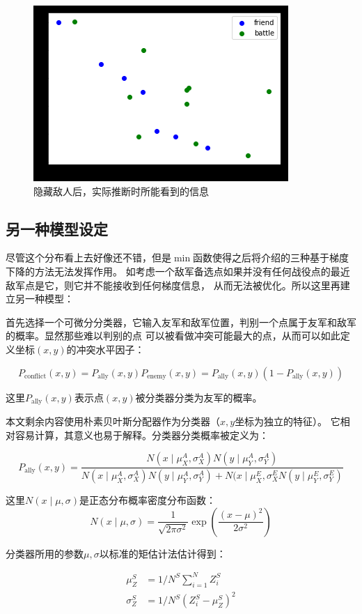 \documentclass{article}
\begin{document}
\begin{figure}[ht]
\includegraphics[width=0.6\linewidth]{state_no_enemy.png}
\caption{隐藏敌人后，实际推断时所能看到的信息}
\label{fig:stateNoEnemy}
\end{figure}

\subsection{另一种模型设定}


尽管这个分布看上去好像还不错，但是$\min$函数使得之后将介绍的三种基于梯度下降的方法无法发挥作用。
如考虑一个敌军备选点如果并没有任何战役点的最近敌军点是它，则它并不能接收到任何梯度信息，
从而无法被优化。所以这里再建立另一种模型：

首先选择一个可微分分类器，它输入友军和敌军位置，判别一个点属于友军和敌军的概率。显然那些难以判别的点
可以被看做冲突可能最大的点，从而可以如此定义坐标$(x,y)$的冲突水平因子：

$$
P_{\text{conflict}}(x,y) = P_\text{ally}(x,y) P_\text{enemy}(x,y) = P_\text{ally}(x,y)(1-P_\text{ally}(x,y))
$$


这里$P_\text{ally}(x,y)$表示点$(x,y)$被分类器分类为友军的概率。

本文剩余内容使用朴素贝叶斯分配器作为分类器（$x,y$坐标为独立的特征）。
它相对容易计算，其意义也易于解释。分类器分类概率被定义为：

$$
P_\text{ally}(x,y) = \frac{
N(x\mid \mu^A_X ,\sigma^A_X) N(y \mid \mu^A_Y, \sigma^A_Y)
}{
N(x \mid \mu^A_X , \sigma^A_X) N(y \mid \mu^A_Y , \sigma^A_Y) + 
N(x \mid \mu^E_X , \sigma^E_X N(y \mid \mu^E_Y , \sigma^E_Y)
}
$$


这里$N(x \mid \mu,\sigma)$是正态分布概率密度分布函数：
$$
N(x \mid \mu,\sigma) = \frac{1}{\sqrt{2\pi \sigma^2}} \exp\left(\frac{(x-\mu)^2}{2\sigma^2}\right)
$$


分类器所用的参数$\mu,\sigma$以标准的矩估计法估计得到：

\begin{align*}
\mu_Z^S    &= 1/N^S \sum_{i=1}^N Z_i^S \\
\sigma_Z^S &= 1/N^S (Z_i^S - \mu_Z^S)^2
\end{align*}
\end{document}
